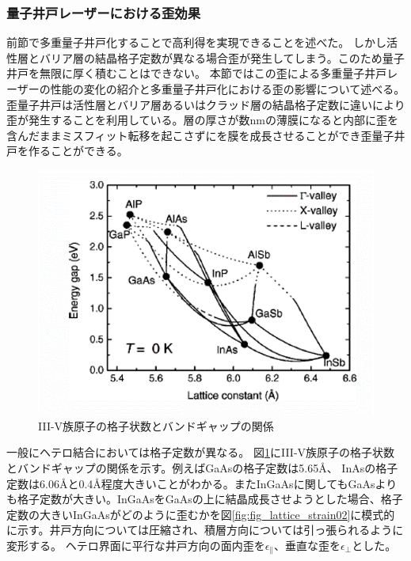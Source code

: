 \subsubsection{量子井戸レーザーにおける歪効果}
前節で多重量子井戸化することで高利得を実現できることを述べた。
しかし活性層とバリア層の結晶格子定数が異なる場合歪が発生してしまう。このため量子井戸を無限に厚く積むことはできない。
本節ではこの歪による多重量子井戸レーザーの性能の変化の紹介と多重量子井戸化における歪の影響について述べる。
歪量子井戸は活性層とバリア層あるいはクラッド層の結晶格子定数に違いにより歪が発生することを利用している。層の厚さが数nmの薄膜になると内部に歪を含んだままミスフィット転移を起こさずにを膜を成長させることができ歪量子井戸を作ることができる。
\begin{figure}[h]
	\centering
	\includegraphics[width=14cm]{figure/fig_1_1_lattice_constance.png}
	\caption{III-V族原子の格子状数とバンドギャップの関係\cite{ref_band_para}}
	\label{fig:fig_1_1_lattice_constance}
\end{figure}

一般にヘテロ結合においては格子定数が異なる。
図\ref{fig:fig_1_1_lattice_constance}にIII-V族原子の格子状数とバンドギャップの関係を示す\cite{ref_band_para}。例えばGaAsの格子定数は5.65\AA 、 InAsの格子定数は6.06\AA と0.4\AA 程度大きいことがわかる。またInGaAsに関してもGaAsよりも格子定数が大きい。InGaAsをGaAsの上に結晶成長させようとした場合、格子定数の大きいInGaAsがどのように歪むかを図\ref{fig:fig_lattice_strain02}に模式的に示す。井戸方向については圧縮され、積層方向については引っ張られるように変形する。
ヘテロ界面に平行な井戸方向の面内歪を$\epsilon_{\|}$、垂直な歪を$\epsilon_{\bot}$とした。

